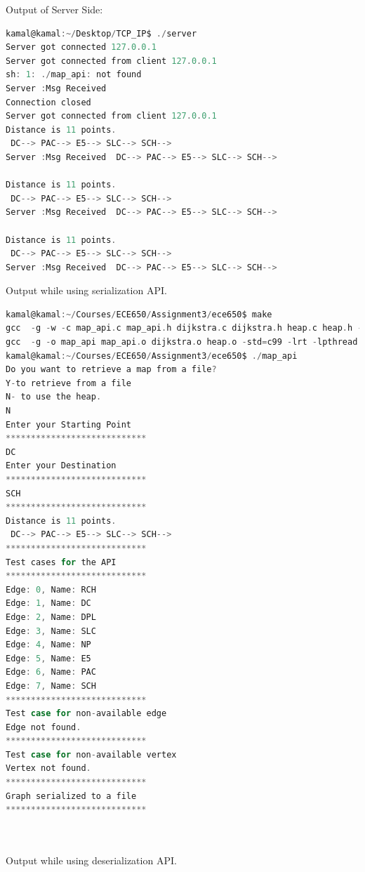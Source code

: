 \documentclass[10pt]{article}
\begin{document}
Output of Server Side:
\begin{lstlisting}[language=C]
kamal@kamal:~/Desktop/TCP_IP$ ./server 
Server got connected 127.0.0.1
Server got connected from client 127.0.0.1
sh: 1: ./map_api: not found
Server :Msg Received 
Connection closed
Server got connected from client 127.0.0.1
Distance is 11 points.
 DC--> PAC--> E5--> SLC--> SCH--> 
Server :Msg Received  DC--> PAC--> E5--> SLC--> SCH--> 

Distance is 11 points.
 DC--> PAC--> E5--> SLC--> SCH--> 
Server :Msg Received  DC--> PAC--> E5--> SLC--> SCH--> 

Distance is 11 points.
 DC--> PAC--> E5--> SLC--> SCH--> 
Server :Msg Received  DC--> PAC--> E5--> SLC--> SCH--> 
\end{lstlisting}
Output while using serialization API.
\begin{lstlisting}[language=C]
kamal@kamal:~/Courses/ECE650/Assignment3/ece650$ make
gcc  -g -w -c map_api.c map_api.h dijkstra.c dijkstra.h heap.c heap.h -std=c99 -lrt -lpthread
gcc  -g -o map_api map_api.o dijkstra.o heap.o -std=c99 -lrt -lpthread
kamal@kamal:~/Courses/ECE650/Assignment3/ece650$ ./map_api 
Do you want to retrieve a map from a file? 
Y-to retrieve from a file
N- to use the heap.
N
Enter your Starting Point
****************************
DC
Enter your Destination
****************************
SCH
****************************
Distance is 11 points.
 DC--> PAC--> E5--> SLC--> SCH--> 
****************************
Test cases for the API
****************************
Edge: 0, Name: RCH
Edge: 1, Name: DC
Edge: 2, Name: DPL
Edge: 3, Name: SLC
Edge: 4, Name: NP
Edge: 5, Name: E5
Edge: 6, Name: PAC
Edge: 7, Name: SCH
****************************
Test case for non-available edge
Edge not found. 
****************************
Test case for non-available vertex
Vertex not found. 
****************************
Graph serialized to a file
****************************
\end{lstlisting}\\
\\
Output while using deserialization API.
\end{document}
